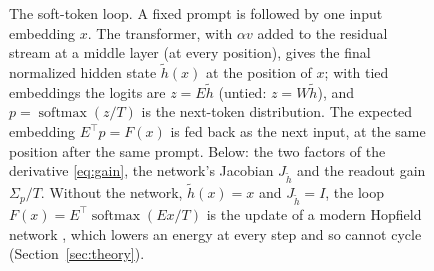 \begin{figure}[H]
\caption{The soft-token loop. A fixed prompt is followed by one input embedding $x$. The transformer, with $\alpha v$
added to the residual stream at a middle layer (at every position), gives the final normalized hidden state
$\tilde h(x)$ at the position of $x$; with tied embeddings the logits are $z=E\tilde h$ (untied: $z=W\tilde h$), and
$p=\operatorname{softmax}(z/T)$ is the next-token distribution. The expected embedding $E^{\top}p=F(x)$ is fed back
as the next input, at the same position after the same prompt. Below: the two factors of the derivative
\eqref{eq:gain}, the network's Jacobian $J_{\tilde h}$ and the readout gain $\Sigma_p/T$. Without the network,
$\tilde h(x)=x$ and $J_{\tilde h}=I$, the loop $F(x)=E^{\top}\operatorname{softmax}(Ex/T)$ is the update of a modern
Hopfield network \cite{ramsauer2020hopfield}, which lowers an energy at every step and so cannot cycle (Section~\ref{sec:theory}).}
\label{fig:loop}
\end{figure}
